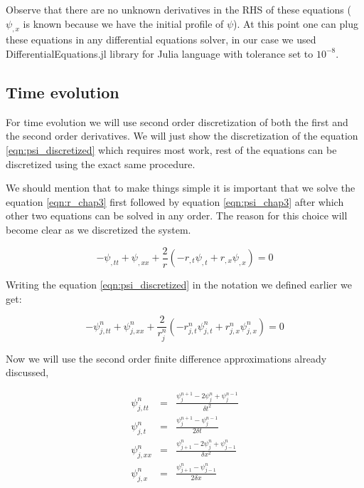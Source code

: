 Observe that there are no unknown derivatives in the RHS of these equations ($\psi _{,x}$ is known because we have the initial profile of $\psi$). At this point one can plug these equations in any differential equations solver, in our case we used DifferentialEquations.jl library for Julia language with tolerance set to $10^{-8}$.



\subsection{Time evolution}

For time evolution we will use second order discretization of both the first and the second order derivatives. We will just show the discretization of the equation \ref{eqn:psi_discretized} which requires most work, rest of the equations can be discretized using the exact same procedure.

We should mention that to make things simple it is important that we solve the equation \ref{eqn:r_chap3} first followed by equation \ref{eqn:psi_chap3} after which other two equations can be solved in any order. The reason for this choice will become clear as we discretized the system.

\begin{equation}
    -\psi_{, t t}+\psi_{, x x}+\frac{2}{r}\left(-r_{, t} \psi_{, t}+r_{, x} \psi_{, x}\right)=0
    \label{eqn:psi_discretized}
\end{equation}

Writing the equation \ref{eqn:psi_discretized} in the notation we defined earlier we get:

\begin{equation}
    -\psi^n_{j, t t}+\psi^n_{j, x x}+\frac{2}{r^n_j}\left(-r^n_{j, t} \psi^n_{j, t}+r^n_{j, x} \psi^n_{j, x}\right)=0
    \label{eqn:psi_discretized_notation}
\end{equation}

Now we will use the second order finite difference approximations already discussed,

\begin{eqnarray}
    \label{eqn:beg_discretizations}
    \psi^n_{j,tt} &=& \frac{\psi^{n+1}_j - 2 \psi^{n}_j + \psi^{n-1}_j}{\delta t^2} \\
    \psi^n_{j,t} &=& \frac{\psi^{n+1}_j -  \psi^{n-1}_j}{2\delta t} \\
    \psi^n_{j,xx} &=& \frac{\psi^{n}_{j+1} - 2 \psi^{n}_j + \psi^{n}_{j-1}}{\delta x^2} \\
    \psi^n_{j,x} &=& \frac{\psi^{n}_{j+1} -  \psi^{n}_{j-1}}{2\delta x}
    \label{eqn:end_discretizations}
\end{eqnarray}

